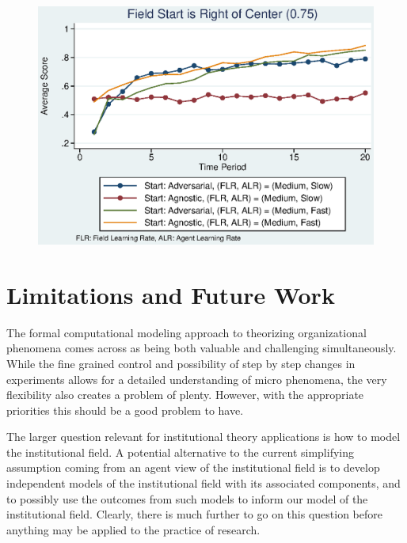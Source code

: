 \documentclass[12pt,letterpaper]{article}
\begin{document}
\begin{figure}[h]
\begin{centering}
  \caption{}
  \includegraphics[width=\textwidth]{frcmedium3g}
  \label{fig:3g}
\end{centering}
\end{figure}

\section{Limitations and Future Work}
The formal computational modeling approach to theorizing organizational phenomena comes across as being both valuable and challenging simultaneously. While the fine grained control and possibility of step by step changes in experiments allows for a detailed understanding of micro phenomena, the very flexibility also creates a problem of plenty. However, with the appropriate priorities this should be a good problem to have.

The larger question relevant for institutional theory applications is how to model the institutional field. A potential alternative to the current simplifying assumption coming from an agent view of the institutional field is to develop independent models of the institutional field with its associated components, and to possibly use the outcomes from such models to inform our model of the institutional field. Clearly, there is much further to go on this question before anything may be applied to the practice of research.
\end{document}
